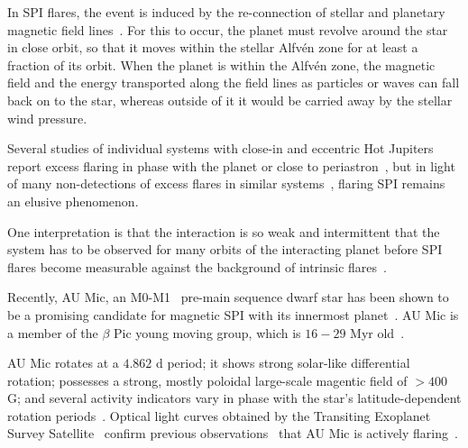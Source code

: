 \documentclass[fleqn,usenatbib,letters]{mnras}%
\begin{document}
In SPI flares, the event is induced by the re-connection of stellar and planetary magnetic field lines~\citep{saur2013,lanza2018close-by,fischer2019}. For this to occur, the planet must revolve around the star in close orbit, so that it moves within the stellar Alfv\'en zone for at least a fraction of its orbit. When the planet is within the Alfv\'en zone, the magnetic field and the energy transported along the field lines as particles or waves can fall back on to the star, whereas outside of it it would be carried away by the stellar wind pressure. 



Several studies of individual systems with close-in and eccentric Hot Jupiters report excess flaring in phase with the planet or close to periastron~\citep{shkolnik2005,pillitteri2011,maggio2015}, but in light of many non-detections of excess flares in similar systems~\citep{figueira2016, fischer2019}, flaring SPI remains an elusive phenomenon. 

One interpretation is that the interaction is so weak and intermittent that the system has to be observed for many orbits of the interacting planet before SPI flares become measurable against the background of intrinsic flares~\citep{shkolnik2008,lanza2009, saur2013,strugarek2015}.

Recently, AU Mic, an M0-M1~\citep{pecaut2013,gaidos2014} pre-main sequence dwarf star has been shown to be a promising candidate for magnetic SPI with its innermost planet~\citep{kavanagh2021}. AU Mic is a member of the $\beta$ Pic young moving group, which is $16-29$ Myr old~\citep{malo2014,binks2014,mamajek2014,bell2015,binks2016,shkolnik2017,miretroig2020}. %

AU Mic rotates at a $4.862$ d period; it shows strong solar-like differential rotation; possesses a strong, mostly poloidal large-scale magentic field of $>400$ G; and several activity indicators vary in phase with the star's latitude-dependent rotation periods~\citep{klein2021}. Optical light curves obtained by the Transiting Exoplanet Survey Satellite~\citep[TESS,][]{ricker2014} confirm previous observations~\citep{katsova1999, robinson2001, redfield2002} that AU Mic is actively flaring~\citep{martioli2021new}.
\end{document}
